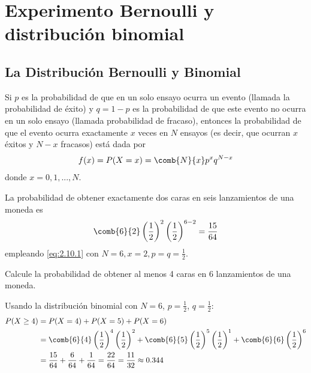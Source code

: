 \section{Experimento Bernoulli y distribución binomial}


\subsection{La Distribución Bernoulli y Binomial}


 Si $p$ es la probabilidad de que en un solo ensayo ocurra un evento (llamada la probabilidad de éxito) y $q = 1 - p$ es la
probabilidad de que este evento no ocurra en un solo ensayo (llamada probabilidad de fracaso), entonces la probabilidad de que el evento ocurra exactamente $x$ veces en $N$ ensayos (es decir, que ocurran $x$ éxitos y $N - x$ fracasos) está
dada por
\begin{align}
 \label{eq:2.10.1}
 f(x)=P(X=x)=\comb{N}{x}p^{x}q^{N-x}
\end{align}
donde $x=0,1,...,N.$


 \begin{ejemplo}
  \label{exmp:2.10.1}
  La probabilidad de obtener exactamente dos caras en seis lanzamientos de una moneda es
  \begin{align}
   \comb{6}{2}\left( \dfrac{1}{2} \right)^{2}\left( \dfrac{1}{2} \right)^{6-2}=\dfrac{15}{64}
  \end{align}
empleando \eqref{eq:2.10.1} con $N=6, x=2, p=q=\frac{1}{2}.$
 \end{ejemplo}



\begin{ejemplo}
 \label{exmp:2.10.2}
 Calcule la probabilidad de obtener al menos 4 caras en 6 lanzamientos de una moneda.
\end{ejemplo}

\begin{solucion}
	Usando la distribución binomial con $N=6$, $p=\frac{1}{2}$, $q=\frac{1}{2}$:
	\begin{align}
		P(X \geq 4) &= P(X=4) + P(X=5) + P(X=6) \\
		&= \comb{6}{4}\left(\frac{1}{2}\right)^4\left(\frac{1}{2}\right)^2 + \comb{6}{5}\left(\frac{1}{2}\right)^5\left(\frac{1}{2}\right)^1 + \comb{6}{6}\left(\frac{1}{2}\right)^6 \\
		&= \frac{15}{64} + \frac{6}{64} + \frac{1}{64} = \frac{22}{64} = \frac{11}{32} \approx 0.344
	\end{align}
\end{solucion}



